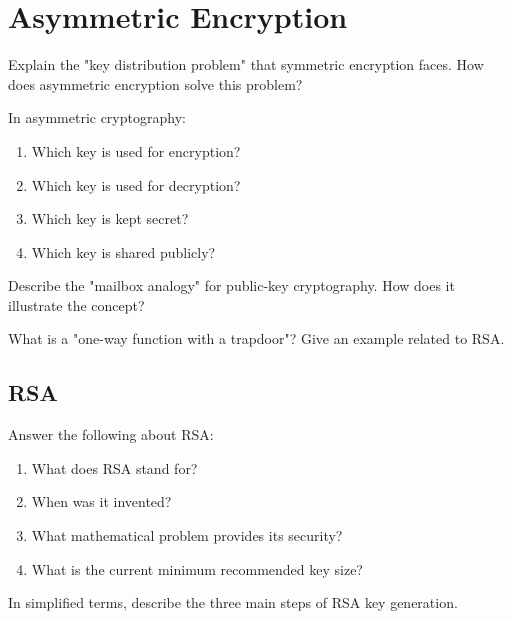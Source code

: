 \documentclass[11pt,a4paper]{report}
\begin{document}
\section{Asymmetric Encryption}

\begin{ex}
Explain the "key distribution problem" that symmetric encryption faces. How does asymmetric encryption solve this problem?
\end{ex}

\begin{ex}
In asymmetric cryptography:
\begin{enumerate}[label=\alph*)]
    \item Which key is used for encryption?
    \item Which key is used for decryption?
    \item Which key is kept secret?
    \item Which key is shared publicly?
\end{enumerate}
\end{ex}

\begin{ex}
Describe the "mailbox analogy" for public-key cryptography. How does it illustrate the concept?
\end{ex}

\begin{ex}
What is a "one-way function with a trapdoor"? Give an example related to RSA.
\end{ex}

\subsection{RSA}

\begin{ex}
Answer the following about RSA:
\begin{enumerate}[label=\alph*)]
    \item What does RSA stand for?
    \item When was it invented?
    \item What mathematical problem provides its security?
    \item What is the current minimum recommended key size?
\end{enumerate}
\end{ex}

\begin{ex}
In simplified terms, describe the three main steps of RSA key generation.
\end{ex}
\end{document}
